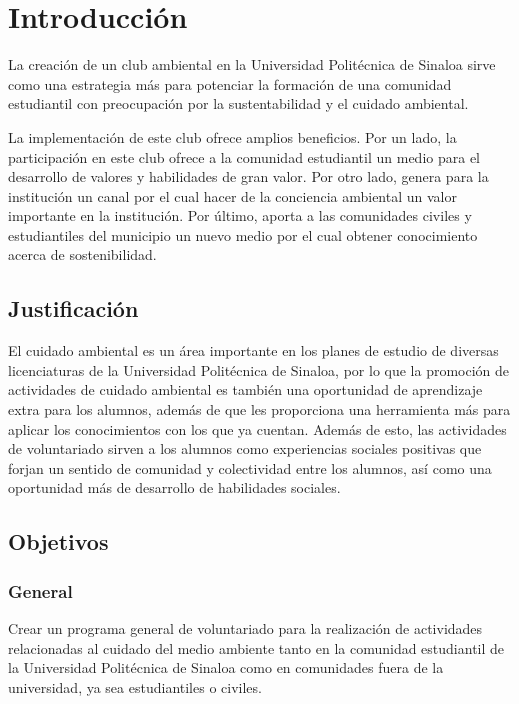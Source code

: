 \chapter{Introducción}

La creación de un club ambiental en la Universidad Politécnica de Sinaloa sirve como una estrategia más para potenciar la formación de una comunidad estudiantil con preocupación por la sustentabilidad y el cuidado ambiental. 

La implementación de este club ofrece amplios beneficios. Por un lado, la participación en este club ofrece a la comunidad estudiantil un medio para el desarrollo de valores y habilidades de gran valor. Por otro lado, genera para la institución un canal por el cual hacer de la conciencia ambiental un valor importante en la institución. Por último, aporta  a las comunidades civiles y estudiantiles del municipio  un nuevo medio por el cual obtener conocimiento acerca de sostenibilidad.

\section{Justificación}

El cuidado ambiental es un área importante en los planes de estudio de diversas licenciaturas de la Universidad Politécnica de Sinaloa, por lo que la promoción de actividades de cuidado ambiental es también una oportunidad de aprendizaje extra para los alumnos, además de que les proporciona una herramienta más para aplicar los conocimientos con los que ya cuentan. Además de esto, las actividades de voluntariado sirven a los alumnos como experiencias sociales positivas que forjan un sentido de comunidad y colectividad entre los alumnos, así como una oportunidad más de desarrollo de habilidades sociales.

\section{Objetivos}

\subsection{General}

Crear un programa general de voluntariado para la realización de actividades relacionadas al cuidado del medio ambiente tanto en la comunidad estudiantil de la Universidad Politécnica de Sinaloa como en comunidades fuera de la universidad, ya sea estudiantiles o civiles.

